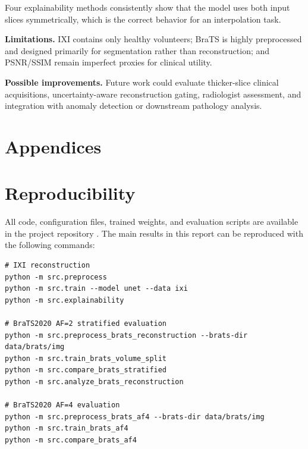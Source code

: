 \documentclass{article}
\begin{document}
Four explainability methods consistently show that the model uses both input slices symmetrically, which is the correct behavior for an interpolation task.

\textbf{Limitations.} IXI contains only healthy volunteers; BraTS is highly preprocessed and designed primarily for segmentation rather than reconstruction; and PSNR/SSIM remain imperfect proxies for clinical utility.

\textbf{Possible improvements.} Future work could evaluate thicker-slice clinical acquisitions, uncertainty-aware reconstruction gating, radiologist assessment, and integration with anomaly detection or downstream pathology
analysis.

\newpage

{\small


}

\appendix

\newpage
\section*{Appendices}
\section{Reproducibility}
\label{app:repro}
All code, configuration files, trained weights, and evaluation scripts are
available in the project repository \cite{github_repo}. The main results in this report can be
reproduced with the following commands:

\begin{verbatim}
# IXI reconstruction
python -m src.preprocess
python -m src.train --model unet --data ixi
python -m src.explainability

# BraTS2020 AF=2 stratified evaluation
python -m src.preprocess_brats_reconstruction --brats-dir data/brats/img
python -m src.train_brats_volume_split
python -m src.compare_brats_stratified
python -m src.analyze_brats_reconstruction

# BraTS2020 AF=4 evaluation
python -m src.preprocess_brats_af4 --brats-dir data/brats/img
python -m src.train_brats_af4
python -m src.compare_brats_af4
\end{verbatim}
\end{document}
